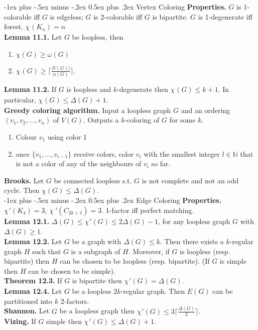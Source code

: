 \documentclass[10pt,landscape]{article}
\makeatletter
\renewcommand{\section}{\@startsection{section}{1}{0mm}%
                                {-1ex plus -.5ex minus -.2ex}%
                                {0.5ex plus .2ex}%
                                {\normalfont\large\bfseries}}
\makeatother
\begin{document}
\begin{multicols}{3}
\section{Vertex Coloring}
\textbf{Properties.} \( G \) is 1-colorable iff \( G \) is edgeless; \( G \) is 2-colorable iff \( G \) is bipartite. \( G \) is 1-degenerate iff forest. \( \chi_{} (K_{n} ) = n \) \\
\textbf{Lemma 11.1.} Let \( G \) be loopless, then
\begin{enumerate}
	\item \( \chi(G) \geq \omega (G) \) 
	\item \( \chi_{} (G)  \geq \lceil \frac{|V(G)|}{\alpha(G)}  \rceil \).
\end{enumerate}
\textbf{Lemma 11.2.} If \( G \) is loopless and \( k \)-degenerate then \( \chi_{} (G) \leq k + 1 \). In particular, \( \chi_{} (G) \leq \Delta (G) + 1 \). \\
\textbf{Greedy coloring algorithm.} Input a loopless graph \( G \) and an ordering \( (v_1, v_2, \hdots , v_{n} ) \) of \( V(G) \). Outputs a \( k \)-coloring of \( G \) for some \(  k\). 
\begin{enumerate}
	\item Colour \( v_1 \) using color 1
	\item once \( \{ v_1, \hdots , v_{i - 1}  \}  \) receive colors, color \( v_{i}  \) with the smallest integer \( l \in \mathbb{N}  \) that is not a color of any of the neighbours of \( v_{i}  \) so far.
\end{enumerate}
\textbf{Brooks.} Let \( G \) be connected loopless s.t. \( G \) is not complete and not an odd cycle. Then \( \chi (G) \leq \Delta (G) \). \\
\section{Edge Coloring}
\textbf{Properties.} \( \chi_{} '(K_{4} ) = 3 \), \( \chi \ ' ( C_{2k+1})  = 3\). 1-factor iff perfect matching. \\
\textbf{Lemma 12.1.} \( \Delta (G) \leq \chi_{} ' (G) \leq 2 \Delta (G) - 1 \), for any loopless graph \( G \) with \( \Delta (G) \geq 1 \). \\
\textbf{Lemma 12.2.} Let \( G \) be a graph with \( \Delta (G) \leq k \). Then there exists a \( k \)-regular graph \( H \) such that \( G \) is a subgraph of \( H \). Moreover, if \( G \) is loopless (resp. bipartite) then \( H \) can be chosen to be loopless (resp. bipartite). (If \( G \) is simple then \( H \) can be chosen to be simple). \\
\textbf{Theorem 12.3.} If \( G \) is bipartite then \( \chi_{} ' (G) = \Delta (G) \). \\
\textbf{Lemma 12.4.} Let \( G \) be a loopless \( 2k \)-regular graph. Then \( E(G) \) can be partitioned into \( k \) 2-factors. \\
\textbf{Shannon.} Let \( G \) be a loopless graph then \( \chi_{} ' (G) \leq 3 \lceil \frac{\Delta (G)}{2}  \rceil  \). \\
\textbf{Vizing.} If \( G \) simple then \( \chi_{} ' (G) \leq \Delta (G) + 1 \).

\end{multicols}
\end{document}
